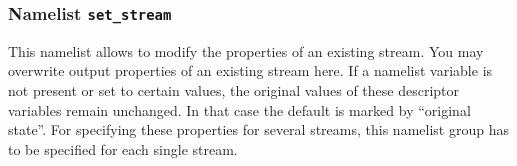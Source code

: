 \subsubsection{Namelist {\tt set\_stream}}

This namelist allows to modify the properties of an existing stream. You
may overwrite output properties of an existing stream here. If a namelist
variable is not present or set to certain values, the original values
of these descriptor variables remain unchanged. In that case the
default is marked by ``original state''.
For
specifying these properties for several streams, this namelist group
has to be specified for each single 
stream.

\setlength{\LTcapwidth}{\textwidth}
\setlength{\LTleft}{0pt}\setlength{\LTright}{0pt}

